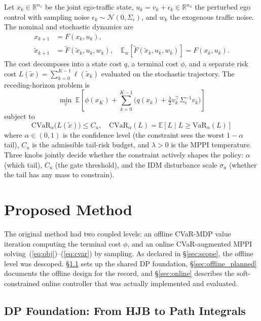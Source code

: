 \documentclass[letterpaper, 10 pt, conference]{ieeeconf}
\begin{document}
Let $x_k \in \mathbb{R}^{n_x}$ be the joint ego-traffic state, $u_k = v_k + \epsilon_k \in \mathbb{R}^{n_u}$ the perturbed ego control with sampling noise $\epsilon_k \sim \mathcal{N}(0, \Sigma_\epsilon)$, and $w_k$ the exogenous traffic noise. The nominal and stochastic dynamics are
\begin{align}
x_{k+1} &= F(x_k, u_k), \\
\tilde{x}_{k+1} &= \tilde{F}(\tilde{x}_k, u_k, w_k), \quad \mathbb{E}_w[\tilde{F}(\tilde{x}_k, u_k, w_k)] = F(x_k, u_k).
\end{align}
The cost decomposes into a state cost $q$, a terminal cost $\phi$, and a separate risk cost $L(\tilde{x}) = \sum_{k=0}^{K-1} \ell(\tilde{x}_k)$ evaluated on the stochastic trajectory. The receding-horizon problem is
\begin{equation}
\min_v \; \mathbb{E}\!\left[ \phi(x_K) + \sum_{k=0}^{K-1} \Big( q(x_k) + \tfrac{\lambda}{2} v_k^\top \Sigma_\epsilon^{-1} v_k \Big) \right]
\label{eq:obj}
\end{equation}
subject to
\begin{equation}
\mathrm{CVaR}_\alpha\!\big(L(\tilde{x})\big) \le C_u, \quad \mathrm{CVaR}_\alpha(L) = \mathbb{E}[L \mid L \ge \mathrm{VaR}_\alpha(L)]
\label{eq:cvar}
\end{equation}
where $\alpha \in (0,1)$ is the confidence level (the constraint sees the worst $1-\alpha$ tail), $C_u$ is the admissible tail-risk budget, and $\lambda > 0$ is the MPPI temperature. Three knobs jointly decide whether the constraint actively shapes the policy: $\alpha$ (which tail), $C_u$ (the gate threshold), and the IDM disturbance scale $\sigma_a$ (whether the tail has any mass to constrain).

\section{Proposed Method}
\label{sec:method}

The original method had two coupled levels: an offline CVaR-MDP value iteration computing the terminal cost $\phi$, and an online CVaR-augmented MPPI solving~(\ref{eq:obj})--(\ref{eq:cvar}) by sampling. As declared in \S\ref{sec:scope}, the offline level was descoped. \S\ref{sec:dp_foundation} sets up the shared DP foundation, \S\ref{sec:offline_planned} documents the offline design for the record, and \S\ref{sec:online} describes the soft-constrained online controller that was actually implemented and evaluated.

\subsection{DP Foundation: From HJB to Path Integrals}
\label{sec:dp_foundation}
\end{document}
